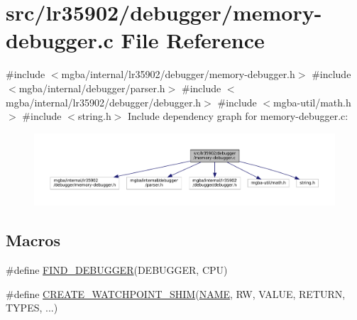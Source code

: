 \hypertarget{lr35902_2debugger_2memory-debugger_8c}{}\section{src/lr35902/debugger/memory-\/debugger.c File Reference}
\label{lr35902_2debugger_2memory-debugger_8c}
{\ttfamily \#include $<$mgba/internal/lr35902/debugger/memory-\/debugger.\+h$>$}\newline
{\ttfamily \#include $<$mgba/internal/debugger/parser.\+h$>$}\newline
{\ttfamily \#include $<$mgba/internal/lr35902/debugger/debugger.\+h$>$}\newline
{\ttfamily \#include $<$mgba-\/util/math.\+h$>$}\newline
{\ttfamily \#include $<$string.\+h$>$}\newline
Include dependency graph for memory-\/debugger.c\+:
\nopagebreak
\begin{figure}[H]
\begin{center}
\leavevmode
\includegraphics[width=350pt]{lr35902_2debugger_2memory-debugger_8c__incl}
\end{center}
\end{figure}
\subsection*{Macros}
\begin{DoxyCompactItemize}
\item 
\#define \mbox{\hyperlink{lr35902_2debugger_2memory-debugger_8c_ac0a015bae6add1406e70a94743727d6d}{F\+I\+N\+D\+\_\+\+D\+E\+B\+U\+G\+G\+ER}}(D\+E\+B\+U\+G\+G\+ER,  C\+PU)
\item 
\#define \mbox{\hyperlink{lr35902_2debugger_2memory-debugger_8c_a476513de7d3b509e146bd83f1b2fa25f}{C\+R\+E\+A\+T\+E\+\_\+\+W\+A\+T\+C\+H\+P\+O\+I\+N\+T\+\_\+\+S\+H\+IM}}(\mbox{\hyperlink{inflate_8h_a164ea0159d5f0b5f12a646f25f99eceaa67bc2ced260a8e43805d2480a785d312}{N\+A\+ME}},  RW,  V\+A\+L\+UE,  R\+E\+T\+U\+RN,  T\+Y\+P\+ES, ...)
\end{DoxyCompactItemize}
